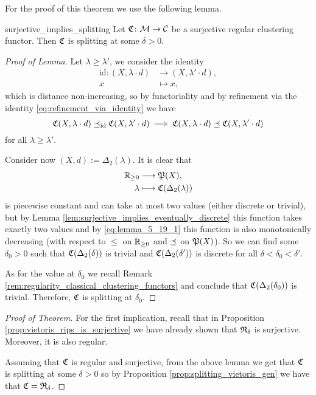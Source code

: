 For the proof of this theorem we use the following lemma.

\begin{lemma}{}{surjective_implies_splitting}
    Let $\Cf\colon \M \to \C$ be a surjective regular clustering functor. Then $\Cf$ is splitting at some $\delta > 0$.
\end{lemma}

\begin{proof}[Proof of Lemma]
    Let $\lambda \ge \lambda'$, we consider the identity
    \begin{align*}
        \mathrm{id}: (X, \lambda \cdot d) &\longrightarrow (X, \lambda' \cdot d),\\
        x &\longmapsto x,
    \end{align*}
    which is distance non-increasing, so by functoriality and by refinement via the identity \eqref{eq:refinement_via_identity} we have
    \begin{equation}
    \label{eq:lemma_5_19_1}
    \Cf(X, \lambda \cdot d) \refines_\mathrm{id} \Cf(X, \lambda' \cdot d) \implies \Cf(X, \lambda \cdot d) \refines \Cf(X, \lambda' \cdot d)
    \end{equation}
    for all $\lambda \ge \lambda'$.

    Consider now $(X,d) := \Delta_2(\lambda)$. It is clear that
    \begin{align*}
        \R_{\geq0} &\longrightarrow \P(X), \\
        \lambda &\longmapsto \Cf(\Delta_2(\lambda))
    \end{align*}
    is piecewise constant and can take at most two values (either discrete or trivial), but by Lemma \ref{lem:surjective_implies_eventually_discrete} this function takes exactly two values and by \eqref{eq:lemma_5_19_1} this function is also monotonically decreasing (with respect to $\le$ on $\R_{\geq0}$ and $\refines$ on $\P(X)$).
    So we can find some $\delta_0 > 0$ such that $\Cf(\Delta_2(\delta))$ is trivial and $\Cf(\Delta_2(\delta'))$ is discrete for all $\delta < \delta_0 < \delta'$.

    As for the value at $\delta_0$ we recall Remark \ref{rem:regularity_classical_clustering_functors} and conclude that $\Cf(\Delta_2(\delta_0))$ is trivial. Therefore, $\Cf$ is splitting at $\delta_0$.
\end{proof}

\begin{proof}[Proof of Theorem]
    For the first implication, recall that in Proposition \ref{prop:vietoris_rips_is_surjective} we have already shown that $\Rf_\delta$ is surjective. Moreover, it is also regular.

    Assuming that $\Cf$ is regular and surjective, from the above lemma we get that $\Cf$ is splitting at some $\delta > 0$ so by Proposition \ref{prop:splitting_vietoris_gen} we have that $\Cf = \Rf_{\delta}$.
\end{proof}
